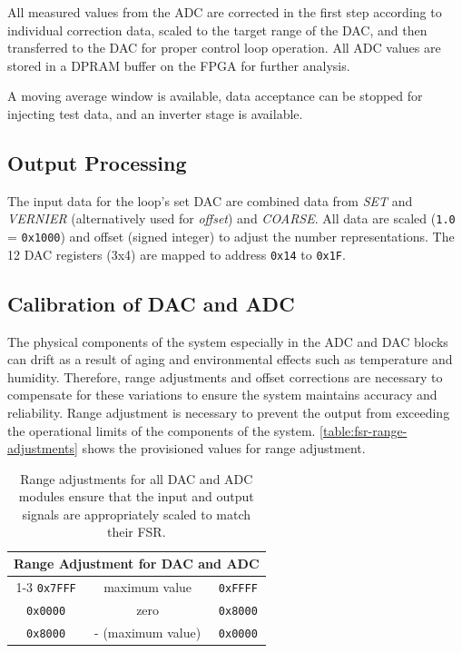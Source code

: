 All measured values from the ADC are corrected in the first step according
to individual correction data, scaled to the target range of the DAC, and
then transferred to the DAC for proper control loop operation.
All ADC values are stored in a \ac{DPRAM} buffer on the FPGA for further
analysis.

A moving average window is available, data acceptance can be stopped for
injecting test data, and an inverter stage is available.

\subsection{Output Processing}
\label{subsec:output-processing}


The input data for the loop's set DAC are combined data from \emph{SET} and
\emph{VERNIER} (alternatively used for \emph{offset}) and \emph{COARSE}.
All data are scaled (\texttt{1.0} = \texttt{0x1000}) and offset (signed integer) to
adjust the number representations.
The 12 DAC registers (3x4) are mapped to address \texttt{0x14} to
\texttt{0x1F}.

\subsection{Calibration of \acs{DAC} and \acs{ADC}}
\label{subsec:dac-and-adc-calibration}

The physical components of the system especially in the \acs{ADC} and \acs{DAC}
blocks can drift as a result of aging and environmental effects such as
temperature and humidity.
Therefore, range adjustments and offset corrections are necessary to compensate for
these variations to ensure the system maintains accuracy and reliability.
Range adjustment is necessary to prevent the output from exceeding the
operational limits of the components of the system.
\autoref{table:fsr-range-adjustments} shows the provisioned values for range
adjustment.

\begin{table}[h]
    \centering
    \begin{tabular}{c|c|c}
        \multicolumn{3}{c}{\small \textbf{Range Adjustment for \acs{DAC} and \acs{ADC}}} \\ \cline{1-3}
        \texttt{0x7FFF} & maximum value     & \texttt{0xFFFF} \\ \hline
        \texttt{0x0000} & zero              & \texttt{0x8000} \\ \hline
        \texttt{0x8000} & - (maximum value) & \texttt{0x0000} \\ \hline
    \end{tabular}
    \caption[\acs{DAC} and \acs{ADC} Range Adjustments]{
        Range adjustments for all DAC and ADC modules ensure that the input and
        output signals are appropriately scaled to match their \acs{FSR}.
    }
    \label{table:fsr-range-adjustments}
\end{table}

